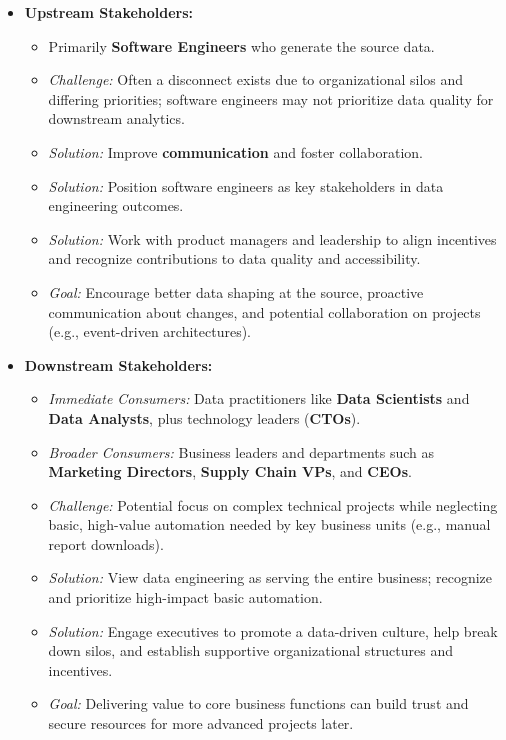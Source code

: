 \begin{itemize}
    \item \textbf{Upstream Stakeholders:}
    \begin{itemize}[label=\textbullet]
        \item Primarily \textbf{Software Engineers} who generate
        the source data.
        \item \textit{Challenge:} Often a disconnect exists due
        to organizational silos and differing priorities; software
        engineers may not prioritize data quality for downstream
        analytics.
        \item \textit{Solution:} Improve \textbf{communication} and
        foster collaboration.
        \item \textit{Solution:} Position software engineers as key
        stakeholders in data engineering outcomes.
        \item \textit{Solution:} Work with product managers and
        leadership to align incentives and recognize contributions
        to data quality and accessibility.
        \item \textit{Goal:} Encourage better data shaping at the
        source, proactive communication about changes, and potential
        collaboration on projects (e.g., event-driven architectures).
    \end{itemize}

    \item \textbf{Downstream Stakeholders:}
    \begin{itemize}[label=\textbullet]
        \item \textit{Immediate Consumers:} Data practitioners like \textbf{Data Scientists} and \textbf{Data Analysts}, plus technology leaders (\textbf{CTOs}).
        \item \textit{Broader Consumers:} Business leaders and departments such as \textbf{Marketing Directors}, \textbf{Supply Chain VPs}, and \textbf{CEOs}.
        \item \textit{Challenge:} Potential focus on complex technical projects while neglecting basic, high-value automation needed by key business units (e.g., manual report downloads).
        \item \textit{Solution:} View data engineering as serving the entire business; recognize and prioritize high-impact basic automation.
        \item \textit{Solution:} Engage executives to promote a data-driven culture, help break down silos, and establish supportive organizational structures and incentives.
        \item \textit{Goal:} Delivering value to core business functions can build trust and secure resources for more advanced projects later.
    \end{itemize}
\end{itemize}

